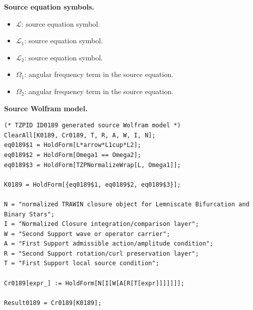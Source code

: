 \begin{minipage}[t]{0.49\linewidth}
\begingroup
\small
\raggedright
\textbf{Source equation symbols.}\par
\begin{itemize}[leftmargin=1.35em,itemsep=1pt,topsep=1pt,parsep=0pt]
    \item $\mathcal{L}$: source equation symbol.
    \item $\mathcal{L}_1$: source equation symbol.
    \item $\mathcal{L}_2$: source equation symbol.
    \item $\Omega_1$: angular frequency term in the source equation.
    \item $\Omega_2$: angular frequency term in the source equation.
\end{itemize}
\endgroup
\end{minipage}\hfill
\begin{minipage}[t]{0.47\linewidth}
\begingroup
\scriptsize
\raggedright
\textbf{Source Wolfram model.}\par
\begin{Verbatim}[fontsize=\tiny,breaklines=true,breakanywhere=true]
(* TZPID ID0189 generated source Wolfram model *)
ClearAll[K0189, Cr0189, T, R, A, W, I, N];
eq0189$1 = HoldForm[L*arrow*L1cup*L2];
eq0189$2 = HoldForm[Omega1 == Omega2];
eq0189$3 = HoldForm[TZPNormalizeWrap[L, Omega1]];

K0189 = HoldForm[{eq0189$1, eq0189$2, eq0189$3}];

N = "normalized TRAWIN closure object for Lemniscate Bifurcation and Binary Stars";
I = "Normalized Closure integration/comparison layer";
W = "Second Support wave or operator carrier";
A = "First Support admissible action/amplitude condition";
R = "Second Support rotation/curl preservation layer";
T = "First Support local source condition";

Cr0189[expr_] := HoldForm[N[I[W[A[R[T[expr]]]]]]];

Result0189 = Cr0189[K0189];
\end{Verbatim}
\endgroup
\end{minipage}

